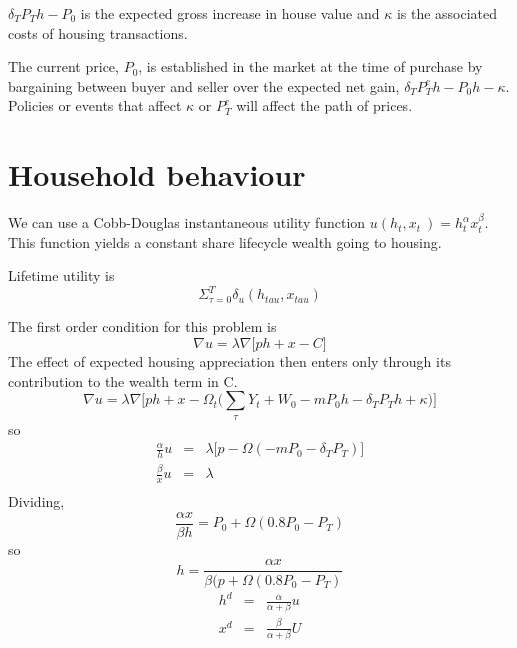 \documentclass[11pt]{amsart}
\begin{document}
$\delta_TP_Th-P_0$ is the expected gross increase in house value and $\kappa$ is the associated costs of housing transactions. 

The current price, $P_0$,  is established in the market at the time of purchase by bargaining between buyer and seller over the expected net gain, $\delta_TP^e_Th -P_0h-\kappa$. Policies or events that affect $\kappa$ or  $P^e_T$ will affect the path of prices.  

\section{Household behaviour}
We can use a Cobb-Douglas instantaneous utility function $ u(h_t,x_t\ )=h_t^{\alpha}  x_t^{\beta}$. This function yields a constant share lifecycle wealth going to housing. 

Lifetime utility is	\[\Sigma_{\tau=0}^T \delta_u(h_{tau},x_{tau}) \]


The first order condition for this problem is 
\[ \nabla u= \lambda \nabla \big[ ph+x - C \big] \]
The effect of expected housing appreciation then enters only through its contribution to the wealth term in C.
\[ \nabla u= \lambda \nabla \big[ ph+x -\Omega_t\big(\sum_{\tau}Y_t+W_0 -m P_0h-\delta_TP_Th + \kappa\big) \big] \]
so 
\begin{eqnarray*}
\frac{\alpha}{h} u&=& \lambda \big[p-\Omega(-mP_0-\delta_TP_T)\big]\\
 \frac{\beta}{x} u&=&\lambda\\
\end{eqnarray*}
Dividing,
\[\frac{\alpha x}{\beta h} =P_0+\Omega(0.8P_0-P_T)\]
so
\[h=\frac{\alpha x}{\beta (p+\Omega(0.8P_0-P_T)} \]
\begin{eqnarray*}
h^d &=&\frac{\alpha}{\alpha+\beta} u\\
x^d &=&\frac{\beta}{\alpha+\beta} U\\
\end{eqnarray*}



\end{document}
